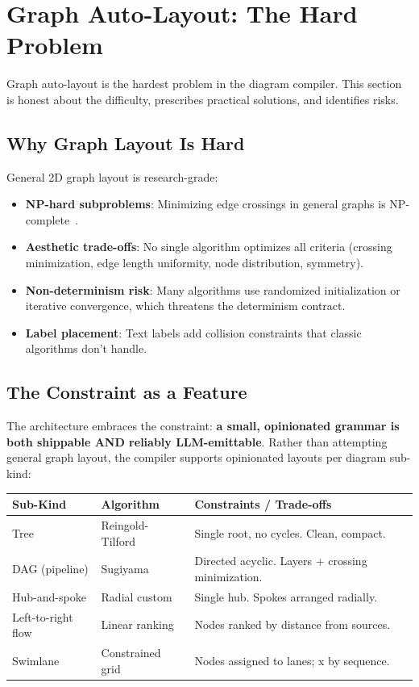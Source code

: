 \section{Graph Auto-Layout: The Hard Problem}
\label{sec:layout-engines}

Graph auto-layout is the hardest problem in the diagram compiler. This section is honest about the difficulty, prescribes practical solutions, and identifies risks.

\subsection{Why Graph Layout Is Hard}

General 2D graph layout is research-grade:

\begin{itemize}
  \item \textbf{NP-hard subproblems}: Minimizing edge crossings in general graphs is NP-complete~\cite{garey1983}.
  \item \textbf{Aesthetic trade-offs}: No single algorithm optimizes all criteria (crossing minimization, edge length uniformity, node distribution, symmetry).
  \item \textbf{Non-determinism risk}: Many algorithms use randomized initialization or iterative convergence, which threatens the determinism contract.
  \item \textbf{Label placement}: Text labels add collision constraints that classic algorithms don't handle.
\end{itemize}

\subsection{The Constraint as a Feature}

The architecture embraces the constraint: \textbf{a small, opinionated grammar is both shippable AND reliably LLM-emittable}. Rather than attempting general graph layout, the compiler supports opinionated layouts per diagram sub-kind:

\begin{center}
\small
\begin{tabular}{llp{7cm}}
\toprule
\textbf{Sub-Kind} & \textbf{Algorithm} & \textbf{Constraints / Trade-offs} \\
\midrule
Tree & Reingold-Tilford~\cite{reingold1981} & Single root, no cycles. Clean, compact. \\
DAG (pipeline) & Sugiyama~\cite{sugiyama1981} & Directed acyclic. Layers + crossing minimization. \\
Hub-and-spoke & Radial custom & Single hub. Spokes arranged radially. \\
Left-to-right flow & Linear ranking & Nodes ranked by distance from sources. \\
Swimlane & Constrained grid & Nodes assigned to lanes; x by sequence. \\
\bottomrule
\end{tabular}
\end{center}

